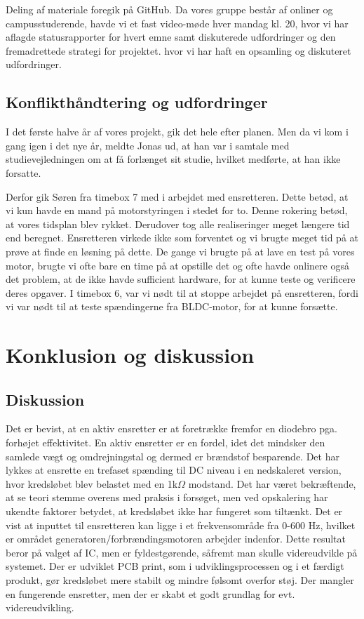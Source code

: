 Deling af materiale foregik på GitHub.%
Da vores gruppe består af onliner og campusstuderende, havde vi et fast video-møde hver mandag kl. 20, hvor vi har aflagde statusrapporter for hvert emne samt diskuterede udfordringer og den fremadrettede strategi for projektet. hvor vi har haft en opsamling og diskuteret udfordringer.

\section{Konflikthåndtering og udfordringer}
\label{sec:konfl-}

I det første halve år af vores projekt, gik det hele efter planen. Men da vi kom i gang igen i det nye år, meldte Jonas ud, at han var i samtale med studievejledningen om at få forlænget sit studie, hvilket medførte, at han ikke forsatte. 

Derfor gik Søren fra timebox 7 med i arbejdet med ensretteren. Dette betød, at vi kun havde en mand på motorstyringen i stedet for to. Denne rokering betød, at vores tidsplan blev rykket. Derudover tog alle realiseringer meget længere tid end beregnet. Ensretteren virkede ikke som forventet og vi brugte meget tid på at prøve at finde en løsning på dette. De  gange vi brugte på at lave en test på vores motor, brugte vi ofte bare en time på at opstille det og ofte havde onlinere også det problem, at de ikke havde sufficient hardware, for at kunne teste og verificere deres opgaver.
I timebox 6, var vi nødt til at stoppe arbejdet på ensretteren, fordi vi var nødt til at teste spændingerne fra BLDC-motor, for at kunne forsætte.

\chapter{Konklusion og diskussion}
\label{cha:konkl-og-disk}

\section{Diskussion}
\label{sec:diskussion}

Det er bevist, at en aktiv ensretter er at foretrække fremfor en diodebro pga. forhøjet effektivitet. En aktiv ensretter er en fordel, idet det mindsker den samlede vægt og omdrejningstal og dermed er brændstof besparende. Det har lykkes at ensrette en trefaset spænding til DC niveau i en nedskaleret version, hvor kredsløbet blev belastet med en 1k$\Omega$ modstand. Det har været bekræftende, at se teori stemme overens med praksis i forsøget, men ved opskalering har ukendte faktorer betydet, at kredsløbet ikke har fungeret som tiltænkt. Det er vist at inputtet til ensretteren kan ligge i et frekvensområde fra 0-600 Hz, hvilket er området generatoren/forbrændingsmotoren arbejder indenfor. Dette resultat beror på valget af IC, men er fyldestgørende, såfremt man skulle videreudvikle på systemet. Der er udviklet PCB print, som i udviklingsprocessen og i et færdigt produkt, gør kredsløbet mere stabilt og mindre følsomt overfor støj. Der mangler en fungerende ensretter, men der er skabt et godt grundlag for evt. videreudvikling.

